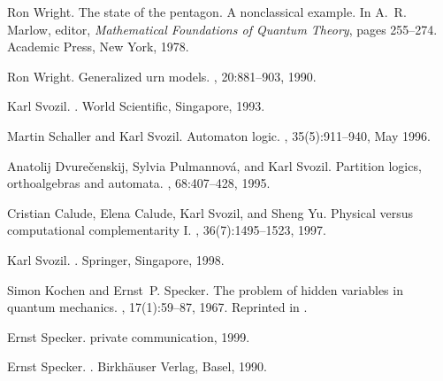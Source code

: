 \begin{thebibliography}{10}

Ron Wright.
\newblock The state of the pentagon. {A} nonclassical example.
\newblock In A.~R. Marlow, editor, {\em Mathematical Foundations of Quantum
  Theory}, pages 255--274. Academic Press, New York, 1978.

Ron Wright.
\newblock Generalized urn models.
, 20:881--903, 1990.

Karl Svozil.
.
\newblock World Scientific, Singapore, 1993.

Martin Schaller and Karl Svozil.
\newblock Automaton logic.
, 35(5):911--940,
  May 1996.

Anatolij Dvure{\v{c}}enskij, Sylvia Pulmannov{\'{a}}, and Karl Svozil.
\newblock Partition logics, orthoalgebras and automata.
, 68:407--428, 1995.

Cristian Calude, Elena Calude, Karl Svozil, and Sheng Yu.
\newblock Physical versus computational complementarity {I}.
, 36(7):1495--1523,
  1997.

Karl Svozil.
.
\newblock Springer, Singapore, 1998.

Simon Kochen and Ernst~P. Specker.
\newblock The problem of hidden variables in quantum mechanics.
, 17(1):59--87, 1967.
\newblock Reprinted in \cite[pp. 235--263]{specker-ges}.

Ernst Specker.
\newblock private communication, 1999.

Ernst Specker.
.
\newblock Birkh{\"{a}}user Verlag, Basel, 1990.

\end{thebibliography}

